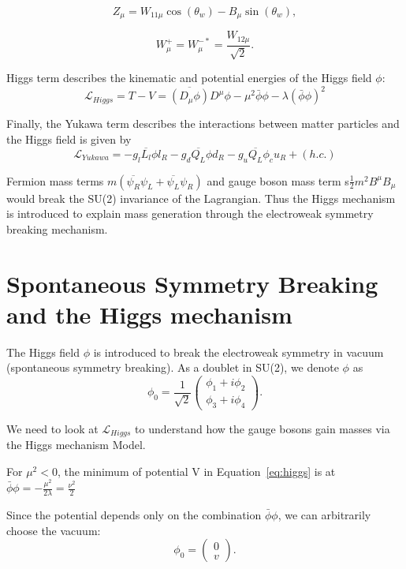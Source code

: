 \begin{equation*}
  Z_\mu=W_{11\mu}\cos\left(\theta_w\right)-B_\mu\sin\left(\theta_w\right),
\end{equation*}

\begin{equation*}
  W_\mu^+=W_\mu^{-*}=\frac{W_{12\mu}}{\sqrt{2}}.
\end{equation*}

\par Higgs term describes the kinematic and potential energies of the Higgs field $\phi$:
\begin{equation}
  \mathcal{L}_{Higgs}= T-V =\overline{\left(D_\mu\phi\right)}D^\mu\phi-\mu^2\bar{\phi}\phi-\lambda(\bar{\phi}\phi)^2
  \label{eq:higgs}
\end{equation}

Finally, the Yukawa term describes the interactions between matter particles and the Higgs field is given by
\begin{equation}
  \mathcal{L}_{Yukawa} = - g_l \overline{L_l}\phi l_R - g_d\overline{Q_L}\phi d_R -  g_u\overline{Q_L}\phi_c u_R + (h.c.)
  \label{eq:yukawa}
\end{equation}
\par Fermion mass terms $m(\overline{\psi_R}\psi_L+\overline{\psi_L}\psi_R)$ and gauge boson mass term s$\frac{1}{2}m^2 B^\mu B_\mu$ would break the SU(2) invariance of the Lagrangian. Thus the Higgs mechanism is introduced to explain mass generation through the electroweak symmetry breaking mechanism.

\section{Spontaneous Symmetry Breaking and the Higgs mechanism}
\par The Higgs field $\phi$ is introduced to break the electroweak symmetry in vacuum (spontaneous symmetry breaking).
As a doublet in SU(2), we denote $\phi$ as
\begin{equation}
  \phi_0=\frac{1}{\sqrt{2}}\left( \begin{smallmatrix} \phi_1+i\phi_2\\ \phi_3+i\phi_4 \end{smallmatrix}\right).
  \label{eq:higgsfield}
\end{equation}

\par We need to look at $ \mathcal{L}_{Higgs}$ to understand how the gauge bosons gain masses via the Higgs mechanism Model.\\
\par For $\mu^2<0$, the minimum of potential V in Equation~\ref{eq:higgs} is at $\bar{\phi}\phi=-\frac{\mu^2}{2\lambda}=\frac{\nu^2}{2}$
\par Since the potential depends only on the combination $\bar{\phi}\phi$, we can arbitrarily choose the vacuum:
\begin{equation}
  \phi_0=\left( \begin{smallmatrix} 0\\v \end{smallmatrix}\right).
\end{equation}


